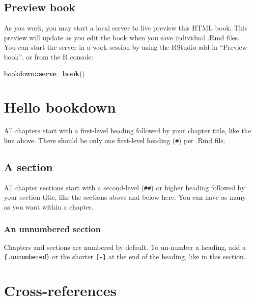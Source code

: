 \documentclass[
]{book}
\newenvironment{Shaded}{\begin{snugshade}}{\end{snugshade}}
\newcommand{\FunctionTok}[1]{\textcolor[rgb]{0.13,0.29,0.53}{\textbf{#1}}}
\newcommand{\NormalTok}[1]{#1}
\newcommand{\SpecialCharTok}[1]{\textcolor[rgb]{0.81,0.36,0.00}{\textbf{#1}}}
\theoremstyle{definition}
\theoremstyle{definition}
\theoremstyle{definition}
\theoremstyle{definition}
\theoremstyle{remark}
\begin{document}
\hypertarget{preview-book}{%
\subsection{Preview book}\label{preview-book}}

As you work, you may start a local server to live preview this HTML book. This preview will update as you edit the book when you save individual .Rmd files. You can start the server in a work session by using the RStudio add-in ``Preview book'', or from the R console:

\begin{Shaded}
\begin{Highlighting}[]
\NormalTok{bookdown}\SpecialCharTok{::}\FunctionTok{serve\_book}\NormalTok{()}
\end{Highlighting}
\end{Shaded}

\hypertarget{hello-bookdown}{%
\section{Hello bookdown}\label{hello-bookdown}}

All chapters start with a first-level heading followed by your chapter title, like the line above. There should be only one first-level heading (\texttt{\#}) per .Rmd file.

\hypertarget{a-section}{%
\subsection{A section}\label{a-section}}

All chapter sections start with a second-level (\texttt{\#\#}) or higher heading followed by your section title, like the sections above and below here. You can have as many as you want within a chapter.

\hypertarget{an-unnumbered-section}{%
\subsubsection*{An unnumbered section}\label{an-unnumbered-section}}

Chapters and sections are numbered by default. To un-number a heading, add a \texttt{\{.unnumbered\}} or the shorter \texttt{\{-\}} at the end of the heading, like in this section.

\hypertarget{cross}{%
\section{Cross-references}\label{cross}}
\end{document}
